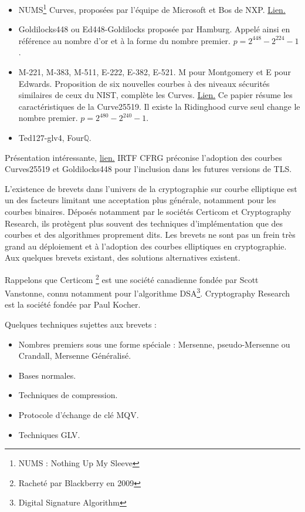 \begin{description}
\begin{itemize}[label=--]
            \item NUMS\footnote{NUMS : Nothing Up My Sleeve} Curves, proposées par l'équipe de Microsoft et Bos de NXP. \href{http://research.microsoft.com/pubs/219966/curvegen.pdf}{Lien.}
            \item Goldilocks448 ou Ed448-Goldilocks proposée par Hamburg. Appelé ainsi en référence au nombre d'or et à la forme du nombre premier. $p = 2^{448} - 2^{224} -1$.
            \item M-221, M-383, M-511, E-222, E-382, E-521. M pour Montgomery et E pour Edwards. Proposition de six nouvelles courbes à des niveaux sécurités similaires de ceux du NIST, complète les Curves. \href{https://eprint.iacr.org/2013/647.pdf}{Lien.} Ce papier résume les caractéristiques de la Curve25519. Il existe la Ridinghood curve seul change le nombre premier. $p = 2^{480} -2^{240} -1$.
            \item Ted127-glv4, Four$\mathbb{Q}$.
        \end{itemize}
\end{description}

Présentation intéressante, \href{http://www.imsc.res.in/~ecc14/slides/costello.pdf}{lien.} IRTF CFRG préconise l'adoption des courbes Curves25519 et Goldilocks448 pour l'inclusion dans les futures versions de TLS.

\vspace{0.5cm}

L'existence de brevets dans l'univers de la cryptographie sur courbe elliptique est un des facteurs limitant une acceptation plus générale, notamment pour les courbes binaires. Déposés notamment par le sociétés Certicom et Cryptography Research, ils protègent plus souvent des techniques d'implémentation que des courbes et des algorithmes proprement dits. Les brevets ne sont pas un frein très grand au déploiement et à l'adoption des courbes elliptiques en cryptographie. Aux quelques brevets existant, des solutions alternatives existent. 

Rappelons que Certicom \footnote{Racheté par Blackberry en 2009} est une société canadienne fondée par Scott Vanstonne, connu notamment pour l'algorithme DSA\footnote{Digital Signature Algorithm}. Cryptography Research est la société fondée par Paul Kocher. 

\noindent Quelques techniques sujettes aux brevets : 
\begin{itemize}[label=--]
    \item Nombres premiers sous une forme spéciale : Mersenne, pseudo-Mersenne ou Crandall, Mersenne Généralisé.
    \item Bases normales.
    \item Techniques de compression.
    \item Protocole d'échange de clé MQV.
    \item Techniques GLV.
\end{itemize}

